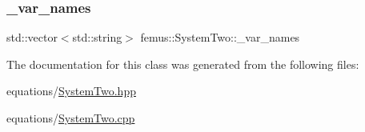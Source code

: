 \mbox{\label{classfemus_1_1_system_two_aa5f825192903a5b25cc5039dbfd05037}} 
\subsubsection{\texorpdfstring{\+\_\+var\+\_\+names}{\_var\_names}}
{\footnotesize\ttfamily std\+::vector$<$std\+::string$>$ femus\+::\+System\+Two\+::\+\_\+var\+\_\+names}



The documentation for this class was generated from the following files\+:\begin{DoxyCompactItemize}
\item 
equations/\mbox{\hyperlink{_system_two_8hpp}{System\+Two.\+hpp}}\item 
equations/\mbox{\hyperlink{_system_two_8cpp}{System\+Two.\+cpp}}\end{DoxyCompactItemize}
